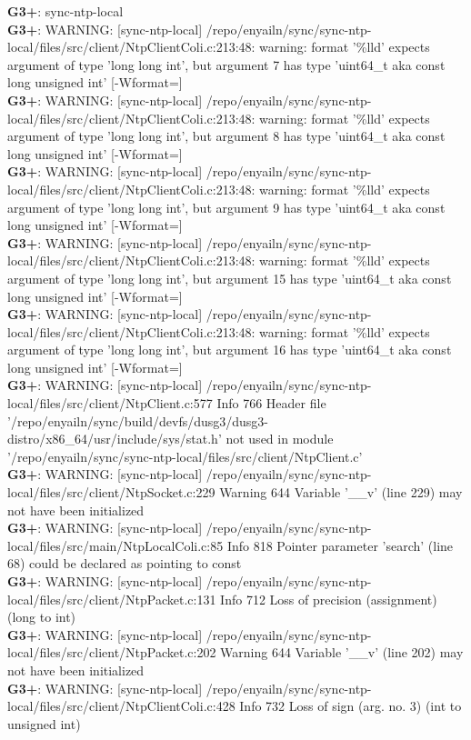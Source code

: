 \documentclass[12pt,twoside]{article}
\begin{document}
\textbf{G3+}: sync-ntp-local\\ 
\textbf{G3+}: WARNING: [sync-ntp-local] /repo/enyailn/sync/sync-ntp-local/files/src/client/NtpClientColi.c:213:48: warning: format '\%lld' expects argument of type 'long long int', but argument 7 has type 'uint64\_t {aka const long unsigned int}' [-Wformat=]\\ 
\textbf{G3+}: WARNING: [sync-ntp-local] /repo/enyailn/sync/sync-ntp-local/files/src/client/NtpClientColi.c:213:48: warning: format '\%lld' expects argument of type 'long long int', but argument 8 has type 'uint64\_t {aka const long unsigned int}' [-Wformat=]\\ 
\textbf{G3+}: WARNING: [sync-ntp-local] /repo/enyailn/sync/sync-ntp-local/files/src/client/NtpClientColi.c:213:48: warning: format '\%lld' expects argument of type 'long long int', but argument 9 has type 'uint64\_t {aka const long unsigned int}' [-Wformat=]\\ 
\textbf{G3+}: WARNING: [sync-ntp-local] /repo/enyailn/sync/sync-ntp-local/files/src/client/NtpClientColi.c:213:48: warning: format '\%lld' expects argument of type 'long long int', but argument 15 has type 'uint64\_t {aka const long unsigned int}' [-Wformat=]\\ 
\textbf{G3+}: WARNING: [sync-ntp-local] /repo/enyailn/sync/sync-ntp-local/files/src/client/NtpClientColi.c:213:48: warning: format '\%lld' expects argument of type 'long long int', but argument 16 has type 'uint64\_t {aka const long unsigned int}' [-Wformat=]\\ 
\textbf{G3+}: WARNING: [sync-ntp-local] /repo/enyailn/sync/sync-ntp-local/files/src/client/NtpClient.c:577 Info 766 Header file '/repo/enyailn/sync/build/devfs/dusg3/dusg3-distro/x86\_64/usr/include/sys/stat.h' not used in module '/repo/enyailn/sync/sync-ntp-local/files/src/client/NtpClient.c'\\ 
\textbf{G3+}: WARNING: [sync-ntp-local] /repo/enyailn/sync/sync-ntp-local/files/src/client/NtpSocket.c:229 Warning 644 Variable '\_\_v' (line 229) may not have been initialized\\ 
\textbf{G3+}: WARNING: [sync-ntp-local] /repo/enyailn/sync/sync-ntp-local/files/src/main/NtpLocalColi.c:85 Info 818 Pointer parameter 'search' (line 68) could be declared as pointing to const\\ 
\textbf{G3+}: WARNING: [sync-ntp-local] /repo/enyailn/sync/sync-ntp-local/files/src/client/NtpPacket.c:131 Info 712 Loss of precision (assignment) (long to int)\\ 
\textbf{G3+}: WARNING: [sync-ntp-local] /repo/enyailn/sync/sync-ntp-local/files/src/client/NtpPacket.c:202 Warning 644 Variable '\_\_v' (line 202) may not have been initialized\\ 
\textbf{G3+}: WARNING: [sync-ntp-local] /repo/enyailn/sync/sync-ntp-local/files/src/client/NtpClientColi.c:428 Info 732 Loss of sign (arg. no. 3) (int to unsigned int)\\ 
  
\end{document}
